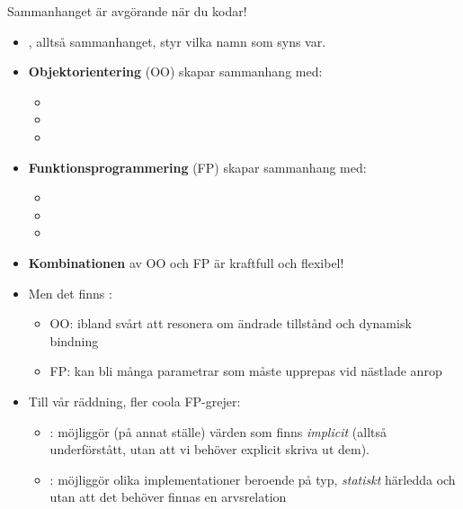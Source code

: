 \begin{Slide}{Sammanhanget är avgörande när du kodar!}
\begin{itemize}\SlideFontSmall
  \item {}, alltså sammanhanget, styr vilka namn som syns var.
  \pause
  \item \textbf{Objektorientering} (OO) skapar sammanhang med:
  \begin{itemize}\SlideFontTiny
    \item {}
    \item {}
    \item {}
  \end{itemize} 
  \pause
  \item \textbf{Funktionsprogrammering} (FP) skapar sammanhang med:
  \begin{itemize}\SlideFontTiny
    \item {}
    \item {}
    \item {}
  \end{itemize}
  \pause
  \item \textbf{Kombinationen} av OO och FP är  kraftfull och flexibel!
  \pause
  \item Men det finns :
  \begin{itemize}\SlideFontTiny
    \item OO: ibland svårt att resonera om ändrade tillstånd och dynamisk bindning
    \item FP: kan bli många parametrar som måste upprepas vid nästlade anrop
  \end{itemize} 
  \pause
  \item Till vår räddning, fler coola FP-grejer: 
  \begin{itemize}\SlideFontTiny
    \item {}: möjliggör (på annat ställe)  värden som finns \emph{implicit} (alltså underförstått, utan att vi behöver explicit skriva ut dem).
    \item {}: möjliggör olika implementationer beroende på typ, \emph{statiskt} härledda och utan att det behöver finnas en arvsrelation  
  \end{itemize} 
\end{itemize}
\end{Slide}

